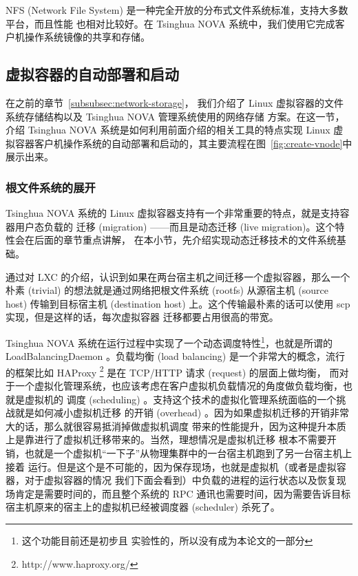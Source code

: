 NFS (Network File System) 是一种完全开放的分布式文件系统标准，支持大多数平台，而且性能
也相对比较好。在 Tsinghua NOVA 系统中，我们使用它完成客户机操作系统镜像的共享和存储。

\subsection{虚拟容器的自动部署和启动}

在之前的章节~\ref{subsubsec:network-storage}，
我们介绍了 Linux 虚拟容器的文件系统存储结构以及 Tsinghua NOVA 管理系统使用的网络存储
方案。在这一节，介绍 Tsinghua NOVA 系统是如何利用前面介绍的相关工具的特点实现 Linux
虚拟容器客户机操作系统的自动部署和启动的，其主要流程在图~\ref{fig:create-vnode}中
展示出来。

\subsubsection{根文件系统的展开}
\label{subsubsec:deployment-rootfs}

Tsinghua NOVA 系统的 Linux 虚拟容器支持有一个非常重要的特点，就是支持容器用户态负载的
迁移 (migration) ——而且是动态迁移 (live migration)。这个特性会在后面的章节重点讲解，
在本小节，先介绍实现动态迁移技术的文件系统基础。

通过对 LXC 的介绍，认识到如果在两台宿主机之间迁移一个虚拟容器，那么一个朴素 (trivial)
的想法就是通过网络把根文件系统 (rootfs) 从源宿主机 (source host) 传输到目标宿主机
(destination host) 上。这个传输最朴素的话可以使用 scp 实现，但是这样的话，每次虚拟容器
迁移都要占用很高的带宽。

Tsinghua NOVA 系统在运行过程中实现了一个动态调度特性\footnote{这个功能目前还是初步且
实验性的，所以没有成为本论文的一部分}，也就是所谓的 LoadBalancingDaemon 。负载均衡
(load balancing) 是一个非常大的概念，流行的框架比如 HAProxy
\footnote{http://www.haproxy.org/} 是在 TCP/HTTP 请求 (request) 的层面上做均衡，
而对于一个虚拟化管理系统，也应该考虑在客户虚拟机负载情况的角度做负载均衡，也就是虚拟机的
调度 (scheduling) 。支持这个技术的虚拟化管理系统面临的一个挑战就是如何减小虚拟机迁移
的开销 (overhead) 。因为如果虚拟机迁移的开销非常大的话，那么就很容易抵消掉做虚拟机调度
带来的性能提升，因为这种提升本质上是靠进行了虚拟机迁移带来的。当然，理想情况是虚拟机迁移
根本不需要开销，也就是一个虚拟机“一下子”从物理集群中的一台宿主机跑到了另一台宿主机上接着
运行。但是这个是不可能的，因为保存现场，也就是虚拟机（或者是虚拟容器，对于虚拟容器的情况
我们下面会看到）中负载的进程的运行状态以及恢复现场肯定是需要时间的，而且整个系统的 RPC
通讯也需要时间，因为需要告诉目标宿主机原来的宿主上的虚拟机已经被调度器 (scheduler) 杀死了。

